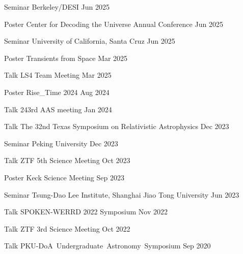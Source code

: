 


\begin{cventries}
	
	\cvsimpentry
	{Seminar}
	{Berkeley/DESI}
	{Jun 2025}
	{}

	\cvsimpentry
	{Poster}
	{Center for Decoding the Universe Annual Conference}
	{Jun 2025}
	{}

	\cvsimpentry
	{Seminar}
	{University of California, Santa Cruz}
	{Jun 2025}
	{}

	\cvsimpentry
	{Poster}
	{Transients from Space}
	{Mar 2025}
	{}

	\cvsimpentry
	{Talk}
	{LS4 Team Meeting}
	{Mar 2025}
	{}

	\cvsimpentry
	{Poster}
	{Rise\_Time 2024}
	{Aug 2024}
	{}

	\cvsimpentry
	{Talk}
	{243rd AAS meeting}
	{Jan 2024}
	{}

	\cvsimpentry
	{Talk}
	{The 32nd Texas Symposium on Relativistic Astrophysics}
	{Dec 2023}
	{}

	\cvsimpentry
	{Seminar}
	{Peking University}
	{Dec 2023}
	{}

	\cvsimpentry
	{Talk}
	{ZTF 5th Science Meeting}
	{Oct 2023}
	{}
	
	\cvsimpentry
	{Poster}
	{Keck Science Meeting}
	{Sep 2023}
	{}

	\cvsimpentry
	{Seminar}
	{Tsung-Dao Lee Institute, Shanghai Jiao Tong University}
	{Jun 2023}
	{}

	\cvsimpentry
	{Talk}
	{SPOKEN-WERRD 2022 Symposium} %
	{Nov 2022} %
	{}

	\cvsimpentry
	{Talk} %
	{ZTF 3rd Science Meeting} %
	{Oct 2022} %
	{}
	
	\cvsimpentry
	{Talk} %
	{PKU-DoA Undergraduate Astronomy Symposium} %
	{Sep 2020} %
	{}

\end{cventries}